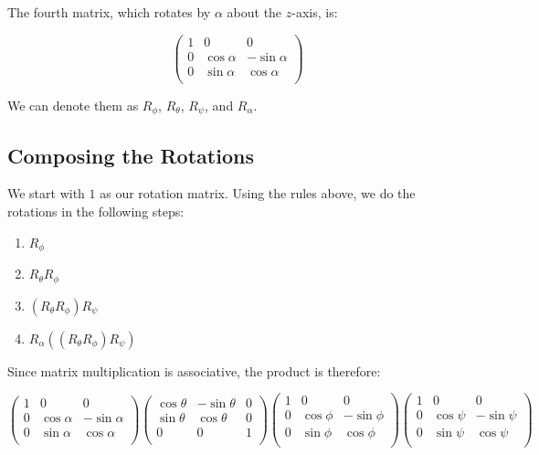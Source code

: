 \documentclass{article}
\begin{document}
The fourth matrix,  which rotates by $\alpha$ about the $z$-axis, is:

\[ \left(
	\begin{matrix}
		1 & 0 & 0 \\
		0 & \cos \alpha & - \sin \alpha \\
		0 & \sin \alpha & \cos \alpha \\
	\end{matrix}
	\right) \]

We can denote them as $R_\phi$, $R_\theta$, $R_\psi$, and $R_\alpha$.

\subsection{Composing the Rotations}

We start with $1$ as our rotation matrix.
Using the rules above, we do the rotations in the following steps:

\begin{enumerate}
\item $R_\phi$
\item $R_\theta R_\phi$
\item $( R_\theta R_\phi ) R_\psi$
\item $R_\alpha ((R_\theta R_\phi) R_\psi)$
\end{enumerate}

Since matrix multiplication is associative, the product is therefore:

\[
	\left(
	\begin{matrix}
		1 & 0 & 0 \\
		0 & \cos \alpha & - \sin \alpha \\
		0 & \sin \alpha & \cos \alpha \\
	\end{matrix}
	\right)
	\left(
	\begin{matrix}
		\cos \theta & - \sin \theta & 0 \\
		\sin \theta & \cos \theta & 0 \\
		0 & 0 & 1 \\	
	\end{matrix}
	\right) 
	\left( 
	\begin{matrix}
		1 & 0 & 0 \\
		0 & \cos \phi & - \sin \phi \\
		0 & \sin \phi & \cos \phi \\
	\end{matrix} \right) 
   \left( 
	\begin{matrix}
		1 & 0 & 0 \\
		0 & \cos \psi & -\sin \psi  \\
		0 & \sin \psi & \cos \psi \\
	\end{matrix} \right) \]
\end{document}
